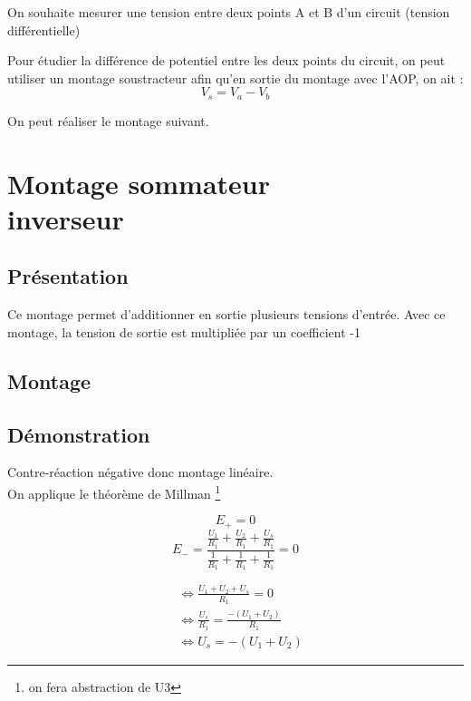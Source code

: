 \begin{exemple}
On souhaite mesurer une tension entre deux points A et B d’un circuit (tension différentielle)
\end{exemple}


Pour étudier la différence de potentiel entre les deux points du circuit, on peut utiliser un montage soustracteur afin qu’en sortie du montage avec l’AOP, on ait : $$V_s=V_a-V_b$$

On peut réaliser le montage suivant.



\chapter{Montage sommateur \\inverseur }

\section{Présentation}
Ce montage permet d'additionner en sortie plusieurs tensions d’entrée. Avec ce montage, la tension de sortie est multipliée par un coefficient -1

\section{Montage}

\section{Démonstration}

Contre-réaction négative donc montage linéaire. \\
On applique le théorème de Millman \footnote{on fera abstraction de U3}

$$E_+=0$$
$$ E_- = \frac{ \frac{U_1}{R_1} + \frac{U_2}{R_1} + \frac{U_s}{R_1} }{\frac{1}{R_1} + \frac{1}{R_1} + \frac{1}{R_1}}=0$$

\begin{align}
&\Leftrightarrow \frac{U_1+U_2+U_s}{R_1}=0 \\
&\Leftrightarrow \frac{U_s}{R_1} = \frac{-(U_1+U_2)}{R_1} \\
&\Leftrightarrow U_s = -(U_1+U_2)
\end{align}

